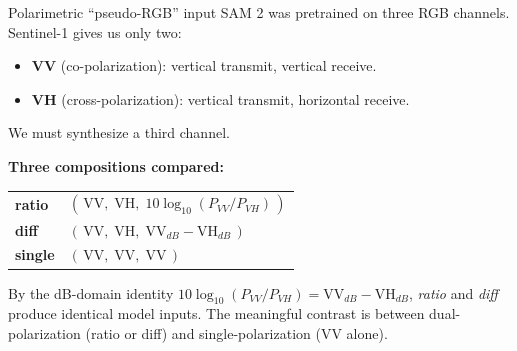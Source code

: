 \documentclass[aspectratio=169,11pt]{beamer}
\begin{document}
\begin{frame}{Polarimetric ``pseudo-RGB'' input}
SAM 2 was pretrained on three RGB channels. Sentinel-1 gives us only two:
\begin{itemize}
    \item \textbf{VV} (co-polarization): vertical transmit, vertical receive.
    \item \textbf{VH} (cross-polarization): vertical transmit, horizontal receive.
\end{itemize}
We must synthesize a third channel.
\vspace{0.8em}

\textbf{Three compositions compared:}
\begin{center}
\small
\begin{tabular}{ll}
\toprule
\textbf{ratio} & $(\,\text{VV},\;\text{VH},\;10 \log_{10}(P_{VV}/P_{VH})\,)$ \\
\textbf{diff}  & $(\,\text{VV},\;\text{VH},\;\text{VV}_{dB} - \text{VH}_{dB}\,)$ \\
\textbf{single} & $(\,\text{VV},\;\text{VV},\;\text{VV}\,)$ \\
\bottomrule
\end{tabular}
\end{center}
\vspace{0.6em}

\small
By the dB-domain identity $10\log_{10}(P_{VV}/P_{VH}) = \text{VV}_{dB} - \text{VH}_{dB}$, \emph{ratio} and \emph{diff} produce identical model inputs. The meaningful contrast is between dual-polarization (ratio or diff) and single-polarization (VV alone).
\end{frame}
\end{document}
